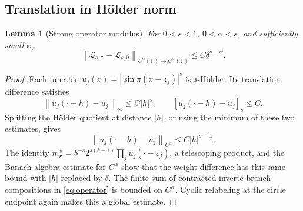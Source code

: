 \documentclass[11pt,a4paper]{article}
\numberwithin{equation}{section}
\newtheorem{lemma}[lemma]{Lemma}
\theoremstyle{definition}
\theoremstyle{remark}
\newcommand{\TT}{\mathbb T}
\newcommand{\Lop}{\mathcal L}
\newcommand{\norm}[1]{\left\lVert#1\right\rVert}
\newcommand{\eps}{\boldsymbol\varepsilon}
\newcommand{\Holder}{C^\alpha(\TT)}
\begin{document}
\subsection{Translation in H\"older norm}
\begin{lemma}[Strong operator modulus]
\label{lem:strong}
For $0<s<1$, $0<\alpha<s$, and sufficiently small $\eps$,
\begin{equation}
 \norm{\Lop_{s,\eps}-\Lop_{s,0}}_{\Holder\to\Holder}
 \leq C\delta^{s-\alpha}.
 \label{eq:strong}
\end{equation}
\end{lemma}
\begin{proof}
Each function $u_j(x)=|\sin\pi(x-z_j)|^s$ is $s$-H\"older. Its
translation difference satisfies
\[
 \norm{u_j(\cdot-h)-u_j}_\infty\leq C|h|^s,
 \qquad [u_j(\cdot-h)-u_j]_s\leq C.
\]
Splitting the H\"older quotient at distance $|h|$, or using the
minimum of these two estimates, gives
\[
 \norm{u_j(\cdot-h)-u_j}_{C^\alpha}\leq C|h|^{s-\alpha}.
\]
The identity
$m_{\eps}^s=b^{-s}2^{s(b-1)}\prod_j u_j(\cdot-\varepsilon_j)$,
a telescoping product, and the Banach algebra estimate for $C^\alpha$
show that the weight difference has this same bound with
$|h|$ replaced by $\delta$. The finite sum of contracted inverse-branch
compositions in \cref{eq:operator} is bounded on $C^\alpha$.
Cyclic relabeling at the circle endpoint again makes this a global
estimate.
\end{proof}
\end{document}
